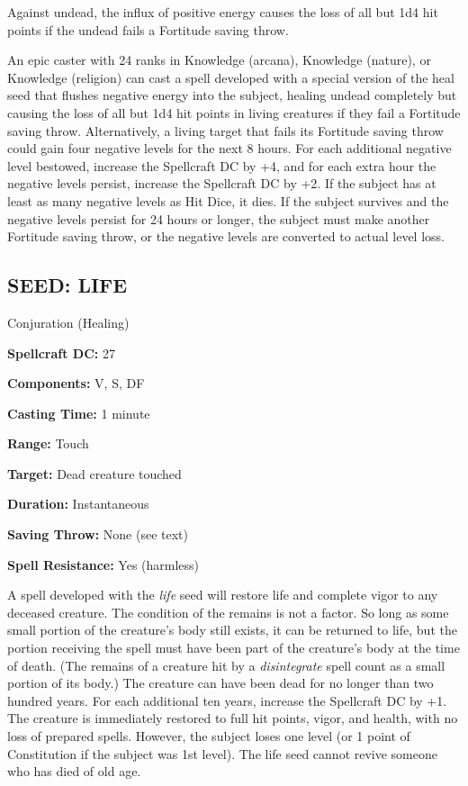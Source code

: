 \documentclass{article}
\begin{document}
Against undead, the influx of positive energy causes the loss of all but 1d4 hit 
points if the undead fails a Fortitude saving throw. 

An epic caster with 24 ranks in Knowledge (arcana), Knowledge (nature), or Knowledge 
(religion) can cast a spell developed with a special version of the heal seed that 
flushes negative energy into the subject, healing undead completely but causing 
the loss of all but 1d4 hit points in living creatures if they fail a Fortitude 
saving throw. Alternatively, a living target that fails its Fortitude saving throw 
could gain four negative levels for the next 8 hours. For each additional negative 
level bestowed, increase the Spellcraft DC by +4, and for each extra hour the negative 
levels persist, increase the Spellcraft DC by +2. If the subject has at least as 
many negative levels as Hit Dice, it dies. If the subject survives and the negative 
levels persist for 24 hours or longer, the subject must make another Fortitude 
saving throw, or the negative levels are converted to actual level loss.

\vspace{12pt}
\subsection*{SEED: LIFE }

Conjuration (Healing) 

\textbf{Spellcraft DC:} 27 

\textbf{Components:} V, S, DF 

\textbf{Casting Time:} 1 minute 

\textbf{Range:} Touch 

\textbf{Target:} Dead creature touched 

\textbf{Duration:} Instantaneous 

\textbf{Saving Throw:} None (see text) 

\textbf{Spell Resistance:} Yes (harmless) 

A spell developed with the \textit{life }seed will restore life and complete vigor 
to any deceased creature. The condition of the remains is not a factor. So long 
as some small portion of the creature's body still exists, it can be returned to 
life, but the portion receiving the spell must have been part of the creature's 
body at the time of death. (The remains of a creature hit by a \textit{disintegrate 
}spell count as a small portion of its body.) The creature can have been dead for 
no longer than two hundred years. For each additional ten years, increase the Spellcraft 
DC by +1. The creature is immediately restored to full hit points, vigor, and health, 
with no loss of prepared spells. However, the subject loses one level (or 1 point 
of Constitution if the subject was 1st level). The life seed cannot revive someone 
who has died of old age. 
\end{document}
